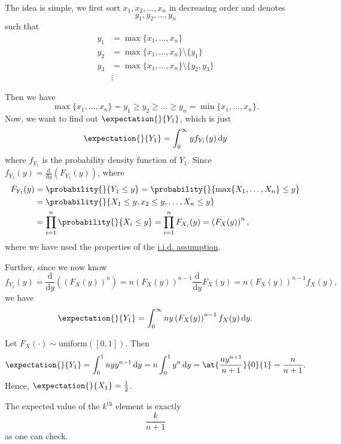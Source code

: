 The idea is simple, we first sort \(x_1, x_2, \ldots , x_n\) in decreasing order and denotes
\[
	y_1, y_2, \ldots , y_{n}
\]
such that
\[
	\begin{split}
		y_1 &= \max\{x_1, \ldots , x_n\}\\
		y_2 &= \max\{x_1, \ldots , x_n\}\setminus \{y_1\}\\
		y_3 &= \max\{x_1, \ldots , x_n\}\setminus \{y_2, y_3\}\\
		&\vdots
	\end{split}
\]

Then we have
\[
	\max\{x_1, \ldots , x_n\} = y_1\geq y_2\geq \ldots \geq y_n = \min\{x_1, \ldots , x_{n}\}.
\]
Now, we want to find out \(\expectation{}{Y_1} \), which is just
\[
	\expectation{}{Y_1} = \int_0^{\infty } y f_{Y_1}(y)\,\mathrm{d}y
\]
where \(f_{Y_1}\) is the probability density function of \(Y_1\). Since \(f_{Y_1}(y) = \frac{\mathrm{d}}{\mathrm{d}y} \left(F_{Y_1}(y)\right)\),
where
\[
	\begin{split}
		F_{Y_1}(y) &= \probability{}{Y_1\leq y}
		= \probability{}{\max\{X_1, \ldots , X_{n}\}\leq y}\\
		&= \probability{}{X_1\leq y,x_2\leq y, \ldots , X_n\leq y}\\
		&= \prod\limits_{i=1}^{n} \probability{}{X_{i}\leq y}
		= \prod\limits_{i=1}^{n} F_{X_{i}}(y)
		= \left(F_X(y)\right)^n,
	\end{split}
\]
where we have used the properties of the \hyperref[def:i.i.d.]{i.i.d. assumption}.

Further, since we now know
\[
	f_{Y_1}(y) = \frac{\mathrm{d}}{\mathrm{d}y}\left(\left(F_X(y)\right)^n\right) = n \left(F_X(y)\right)^{n-1} \frac{\mathrm{d}}{\mathrm{d}y} F_X(y) = n\left(F_X (y)\right)^{n-1}f_X(y),
\]
we have
\[
	\expectation{}{Y_1} = \int_0^{\infty }n y \left(F_{X}(y)\right)^{n-1} f_X(y)\,\mathrm{d}y.
\]

\begin{eg}
	Let \(F_{X}(\cdot)\sim \mathrm{uniform}([0,1]) \). Then
	\[
		\expectation{}{Y_1} = \int_0^1 n y y^{n-1}\,\mathrm{d}y = n\int_0^1 y^n \,\mathrm{d}y = \at{\frac{ny^{n+1}}{n+1}}{0}{1} = \frac{n}{n+1} .
	\]
	Hence, \(\expectation{}{X_1}= \frac{1}{2} \).
	\begin{remark}
		The expected value of the \(k^{\mathrm{th}}\) element is exactly
		\[
			\frac{k}{n+1}
		\]
		as one can check.
	\end{remark}
\end{eg}

